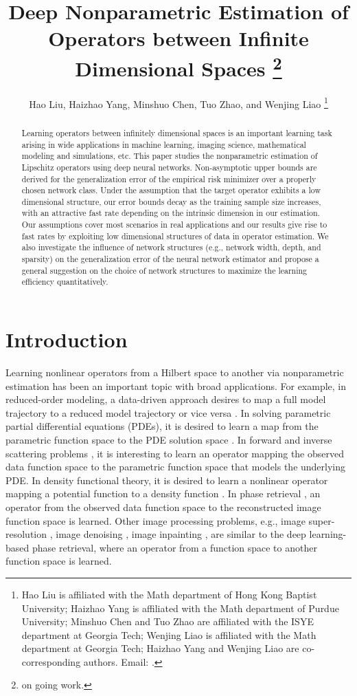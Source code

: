 \documentclass[11pt]{article} %
\title{\huge \bf Deep Nonparametric Estimation of Operators between Infinite Dimensional Spaces \thanks{on going work.}}
\author{Hao Liu, Haizhao Yang, Minshuo Chen, Tuo Zhao, and Wenjing Liao \thanks{Hao Liu is affiliated with the Math department of Hong Kong Baptist University; Haizhao Yang is affiliated with the Math department of Purdue University; Minshuo Chen and Tuo Zhao are affiliated with the ISYE department at Georgia Tech; Wenjing Liao is affiliated with the Math department at Georgia Tech; Haizhao Yang and Wenjing Liao are co-corresponding authors. Email: \text{haoliu@hkbu.edu.hk, haizhao@purdue.edu, $\{$mchen393, tzhao80, wliao60$\}$@gatech.edu}.}}
\begin{document}
\maketitle

\begin{abstract}
Learning operators between infinitely dimensional spaces is an important learning task arising in wide applications in machine learning, imaging science, mathematical modeling and simulations, etc. This paper studies the nonparametric estimation of Lipschitz operators using deep neural networks. Non-asymptotic upper bounds are derived for the generalization error of the empirical risk minimizer over a properly chosen network class.   Under the assumption that the target operator exhibits a low dimensional structure, our error bounds decay as the training sample size increases, with an attractive fast rate depending on the intrinsic dimension in our estimation. Our assumptions cover most scenarios in real applications and our results give rise to fast rates by exploiting low dimensional structures of data in operator estimation. We also investigate the influence of network structures (e.g., network width, depth, and sparsity) on the generalization error of the neural network estimator and propose a general suggestion on the choice of network structures to maximize the learning efficiency quantitatively.
\end{abstract}

\section{Introduction}

Learning nonlinear operators from a Hilbert space to another via nonparametric estimation has been an important topic with broad applications. For example, in reduced-order modeling, a data-driven approach desires to map a full model trajectory to a reduced model trajectory or vice versa \citep{PEHERSTORFER2016196}. In solving parametric partial differential equations (PDEs), it is desired to learn a map from the parametric function space to the PDE solution space \citep{khoo2021solving,li2020fourier,deeponet}. In forward and inverse scattering problems \citep{switchnet,wei2019physics}, it is interesting to learn an operator mapping the observed data function space to the parametric function space that models the underlying PDE. In density functional theory, it is desired to learn a nonlinear operator mapping a potential function to a density function \citep{MNN}. In phase retrieval \citep{phase}, an operator from the observed data function space to the reconstructed image function space is learned. Other image processing problems, e.g., image super-resolution \citep{resolution}, image denoising \citep{Tian_2020}, image inpainting \citep{QIN2021102028}, are similar to the deep learning-based phase retrieval, where  an operator from a function space to another function space is learned.
\end{document}
